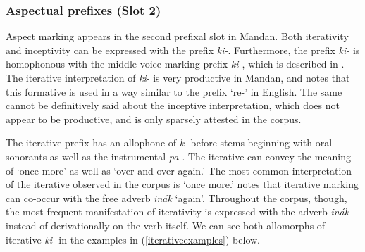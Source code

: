 \subsubsection{Aspectual prefixes (Slot 2)}\label{SubsubsecAspectualPrefixes}

Aspect marking appears in the second prefixal slot in Mandan. Both iterativity and inceptivity can be expressed with the prefix \textit{ki-}. Furthermore, the prefix \textit{ki-} is homophonous with the middle voice marking prefix \textit{ki-}, which is described in . The iterative interpretation of \textit{ki}- is very productive in Mandan, and \citet[11]{kennard1936} notes that this formative is used in a way similar to the prefix `re-' in English. The same cannot be definitively said about the inceptive interpretation, which does not appear to be productive, and is only sparsely attested in the corpus.


The iterative prefix has an allophone of \textit{k}- before stems beginning with oral sonorants as well as the instrumental \textit{pa-}. The iterative can convey the meaning of `once more' as well as `over and over again.' The most common interpretation of the iterative observed in the corpus is `once more.' \citet[29]{mixco1997a} notes that iterative marking can co-occur with the free adverb \textit{inák} `again'. Throughout the corpus, though, the most frequent manifestation of iterativity is expressed with the adverb \textit{inák} instead of derivationally on the verb itself. We can see both allomorphs of iterative \textit{ki}- in the examples in (\ref{iterativeexamples}) below.

